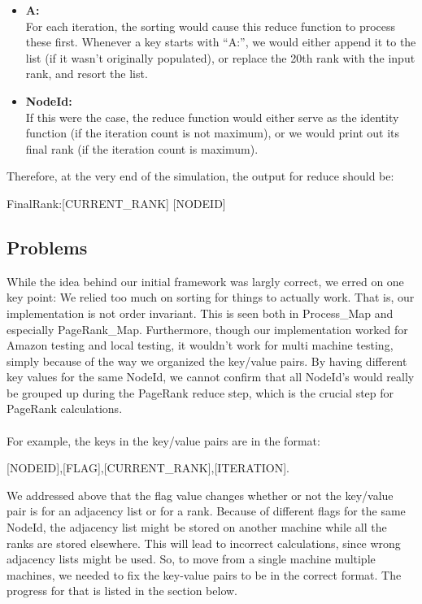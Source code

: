 \begin{itemize}
        \begin{itemize}
          \item \textbf{A:}\\
            For each iteration, the sorting would cause this reduce function to process these first. Whenever a key starts with ``A:'', we would either append it to the list (if it wasn't originally populated), or replace the 20th rank with the input rank, and resort the list.
          \item \textbf{NodeId:} \\
            If this were the case, the reduce function would either serve as the identity function (if the iteration count is not maximum), or we would print out its final rank (if the iteration count is maximum). 
        \end{itemize}

        Therefore, at the very end of the simulation, the output for reduce should be:
        \begin{center}
        FinalRank:[CURRENT\_RANK] \hspace{4mm} [NODEID]
        \end{center}
    \end{itemize}

\subsection*{Problems}
  While the idea behind our initial framework was largly correct, we erred on one key point: We relied too much on sorting for things to actually work. That is, our implementation is not order invariant. This is seen both in Process\_Map and especially PageRank\_Map. Furthermore, though our implementation worked for Amazon testing and local testing, it wouldn't work for multi machine testing, simply because of the way we organized the key/value pairs. By having different key values for the same NodeId, we cannot confirm that all NodeId's would really be grouped up during the PageRank reduce step, which is the crucial step for PageRank calculations.
  \\ \\
  For example, the keys in the key/value pairs are in the format:
  \begin{center}
    [NODEID],[FLAG],[CURRENT\_RANK],[ITERATION].
  \end{center}
  We addressed above that the flag value changes whether or not the key/value pair is for an adjacency list or for a rank. Because of different flags for the same NodeId, the adjacency list might be stored on another machine while all the ranks are stored elsewhere. This will lead to incorrect calculations, since wrong adjacency lists might be used. So, to move from a single machine multiple machines, we needed to fix the key-value pairs to be in the correct format. The progress for that is listed in the section below.

